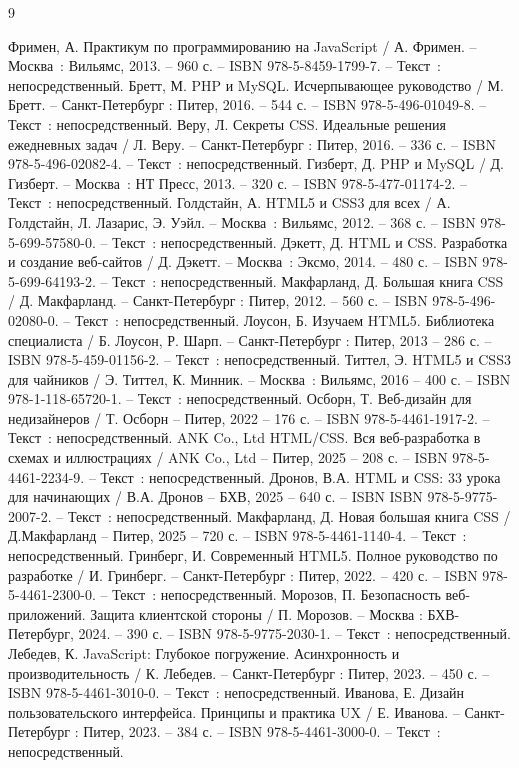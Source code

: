 
\begin{thebibliography}{9}

     Фримен, А. Практикум по программированию на JavaScript / А. Фримен. – Москва~: Вильямс, 2013. – 960 с. – ISBN 978-5-8459-1799-7. – Текст~: непосредственный.
     Бретт, М. PHP и MySQL. Исчерпывающее руководство / М. Бретт. – Санкт-Петербург : Питер, 2016. – 544 с. – ISBN 978-5-496-01049-8. – Текст~: непосредственный.
     Веру, Л. Секреты CSS. Идеальные решения ежедневных задач / Л. Веру. – Санкт-Петербург : Питер, 2016. – 336 с. – ISBN 978-5-496-02082-4. – Текст~: непосредственный.
    	Гизберт, Д. PHP и MySQL / Д. Гизберт. – Москва~: НТ Пресс, 2013. – 320 с. – ISBN 978-5-477-01174-2. – Текст~: непосредственный.
		Голдстайн, А. HTML5 и CSS3 для всех / А. Голдстайн, Л. Лазарис, Э. Уэйл. – Москва~: Вильямс, 2012. – 368 с. – ISBN 978-5-699-57580-0. – Текст~: непосредственный.
		Дэкетт, Д. HTML и CSS. Разработка и создание веб-сайтов / Д. Дэкетт. – Москва~: Эксмо, 2014. – 480 с. – ISBN 978-5-699-64193-2. – Текст~: непосредственный.
		Макфарланд, Д. Большая книга CSS / Д. Макфарланд. – Санкт-Петербург : Питер, 2012. – 560 с. – ISBN 978-5-496-02080-0. – Текст~: непосредственный.
		Лоусон, Б. Изучаем HTML5. Библиотека специалиста / Б. Лоусон, Р. Шарп. – Санкт-Петербург : Питер, 2013 – 286 с. – ISBN 978-5-459-01156-2. – Текст~: непосредственный.
		Титтел, Э. HTML5 и CSS3 для чайников / Э. Титтел, К. Минник. – Москва~: Вильямс, 2016 – 400 с. – ISBN 978-1-118-65720-1. – Текст~: непосредственный.    
		Осборн, Т. Веб-дизайн для недизайнеров / Т. Осборн – Питер, 2022 – 176 с. – ISBN 978-5-4461-1917-2. – Текст~: непосредственный.    
		ANK Co., Ltd  HTML/CSS. Вся веб-разработка в схемах и иллюстрациях  / ANK Co., Ltd –   Питер, 2025 – 208 с. – ISBN 
	978-5-4461-2234-9. – Текст~: непосредственный.    
		Дронов, В.А. HTML и CSS: 33 урока для начинающих / В.А. Дронов – БХВ, 2025 – 640 с. – ISBN ISBN
	978-5-9775-2007-2. – Текст~: непосредственный.    
		Макфарланд, Д. Новая большая книга CSS  / Д.Макфарланд  – Питер, 2025 – 720 с. – ISBN 
	978-5-4461-1140-4. – Текст~: непосредственный.
	 Гринберг, И. Современный HTML5. Полное руководство по разработке / И. Гринберг. – Санкт-Петербург : Питер, 2022. – 420 с. – ISBN 978-5-4461-2300-0. – Текст~: непосредственный.
	 Морозов, П. Безопасность веб-приложений. Защита клиентской стороны / П. Морозов. – Москва : БХВ-Петербург, 2024. – 390 с. – ISBN 978-5-9775-2030-1. – Текст~: непосредственный.
	 Лебедев, К. JavaScript: Глубокое погружение. Асинхронность и производительность / К. Лебедев. – Санкт-Петербург : Питер, 2023. – 450 с. – ISBN 978-5-4461-3010-0. – Текст~: непосредственный.
	 Иванова, Е. Дизайн пользовательского интерфейса. Принципы и практика UX / Е. Иванова. – Санкт-Петербург : Питер, 2023. – 384 с. – ISBN 978-5-4461-3000-0. – Текст~: непосредственный.
\end{thebibliography}
